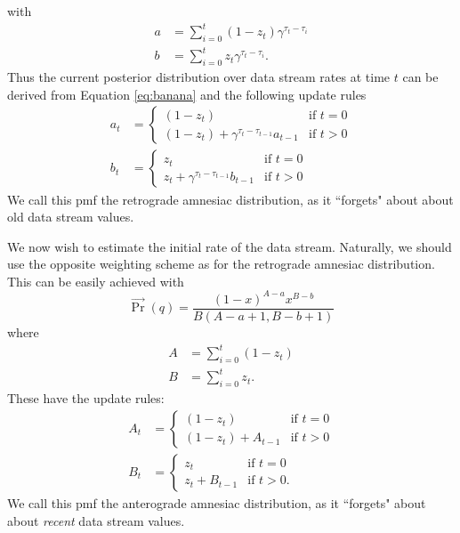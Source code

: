 with
\begin{align}
    a &= \sum_{i=0}^t (1-z_t)\gamma^{\tau_t-\tau_i} \\
    b &= \sum_{i=0}^t z_t\gamma^{\tau_t-\tau_i}.
\end{align}
Thus the current posterior distribution over data stream rates at time $t$ can be derived from Equation \ref{eq:banana} and the following update rules
\begin{align}
    a_t &= \begin{cases} 
        (1-z_t) & \text{if $t=0$} \\ 
        (1-z_t) + \gamma^{\tau_t-\tau_{t-1}} a_{t-1} & \text{if $t>0$} 
    \end{cases} \\
    b_t &= \begin{cases} 
        z_t & \text{if $t=0$} \\ 
        z_t + \gamma^{\tau_t-\tau_{t-1}} b_{t-1} & \text{if $t>0$} 
    \end{cases}
\end{align}
We call this pmf the retrograde amnesiac distribution, as it ``forgets" about about old data stream values.

We now wish to estimate the initial rate of the data stream. Naturally, we should use the opposite weighting scheme as for the retrograde amnesiac distribution. This can be easily achieved with
\begin{equation}
    \overrightarrow{\Pr}(q) = \frac{(1-x)^{A-a} x^{B-b}}{B(A-a+1,B-b+1)} \label{eq:banana_two}
\end{equation}
where
\begin{align}
    A &= \sum_{i=0}^t (1-z_t) \\
    B &= \sum_{i=0}^t z_t.
\end{align}
These have the update rules:
\begin{align}
    A_t &= \begin{cases} 
        (1-z_t) & \text{if $t=0$} \\ 
        (1-z_t) + A_{t-1} & \text{if $t>0$} 
    \end{cases} \\
    B_t &= \begin{cases} 
        z_t & \text{if $t=0$} \\ 
        z_t + B_{t-1} & \text{if $t>0$} .
    \end{cases}
\end{align}
We call this pmf the anterograde amnesiac distribution, as it ``forgets" about about {\it recent} data stream values.

